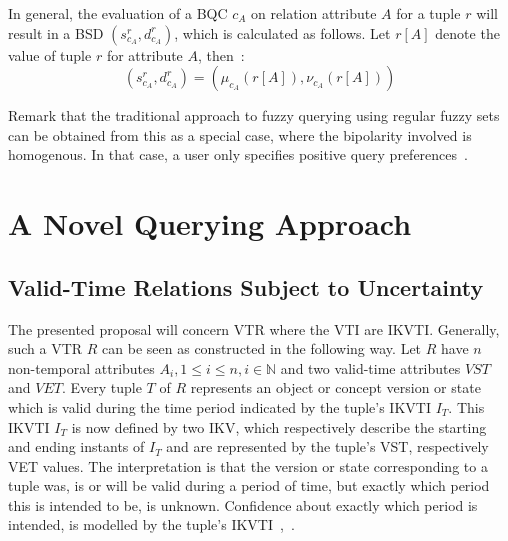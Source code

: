 \documentclass[runningheads,a4paper]{llncs}
\begin{document}
In general, the evaluation of a BQC $c_{A}$ on relation attribute $A$ for a tuple $r$ will result in a BSD $(s_{c_A}^r, d_{c_A}^r)$, which is calculated as follows. Let $r[A]$ denote the value of tuple $r$ for attribute $A$, then~\cite{Matthe2011ijis}:
\begin{equation}\label{eq:bsdeval}
(s_{c_A}^r, d_{c_A}^r)=(\mu_{c_A}(r[A]), \nu_{c_A}(r[A]))
\end{equation}

Remark that the traditional approach to fuzzy querying using regular fuzzy sets can be obtained from this as a special case, where the bipolarity involved is homogenous. In that case, a user only specifies positive query preferences~\cite{Matthe2011ijis}.


\section{A Novel Querying Approach\label{sec:proposal}}

\subsection{Valid-Time Relations Subject to Uncertainty}
The presented proposal will concern VTR where the VTI are IKVTI. Generally, such a VTR $R$ can be seen as constructed in the following way. Let $R$ have $n$ non-temporal attributes $A_{i}, 1 \leq i \leq n, i \in \mathbb{N}$ and two valid-time attributes $VST$ and $VET$. Every tuple $T$ of $R$ represents an object or concept version or state which is valid during the time period indicated by the tuple's IKVTI $I_T$. This IKVTI $I_T$ is now defined by two IKV, which respectively describe the starting and ending instants of $I_T$ and are represented by the tuple's VST, respectively VET values. The interpretation is that the version or state corresponding to a tuple was, is or will be valid during a period of time, but exactly which period this is intended to be, is unknown. Confidence about exactly which period is intended, is modelled by the tuple's IKVTI~\cite{Pons2012ijcis},~\cite{Pons2012ipmu}.
\end{document}

